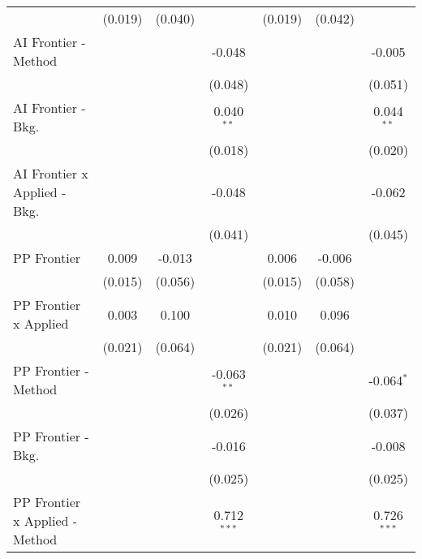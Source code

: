 \begin{tabular}{lcccccc}
                                  & (0.019)     & (0.040)       &                & (0.019)       & (0.042)       &   \\   
   AI Frontier - Method           &             &               & -0.048         &               &               & -0.005\\   
                                  &             &               & (0.048)        &               &               & (0.051)\\   
   AI Frontier - Bkg.             &             &               & 0.040$^{**}$   &               &               & 0.044$^{**}$\\   
                                  &             &               & (0.018)        &               &               & (0.020)\\   
   AI Frontier x Applied - Bkg.   &             &               & -0.048         &               &               & -0.062\\   
                                  &             &               & (0.041)        &               &               & (0.045)\\   
   PP Frontier                    & 0.009       & -0.013        &                & 0.006         & -0.006        &   \\   
                                  & (0.015)     & (0.056)       &                & (0.015)       & (0.058)       &   \\   
   PP Frontier x Applied          & 0.003       & 0.100         &                & 0.010         & 0.096         &   \\   
                                  & (0.021)     & (0.064)       &                & (0.021)       & (0.064)       &   \\   
   PP Frontier - Method           &             &               & -0.063$^{**}$  &               &               & -0.064$^{*}$\\   
                                  &             &               & (0.026)        &               &               & (0.037)\\   
   PP Frontier - Bkg.             &             &               & -0.016         &               &               & -0.008\\   
                                  &             &               & (0.025)        &               &               & (0.025)\\   
   PP Frontier x Applied - Method &             &               & 0.712$^{***}$  &               &               & 0.726$^{***}$\\   

\end{tabular}
